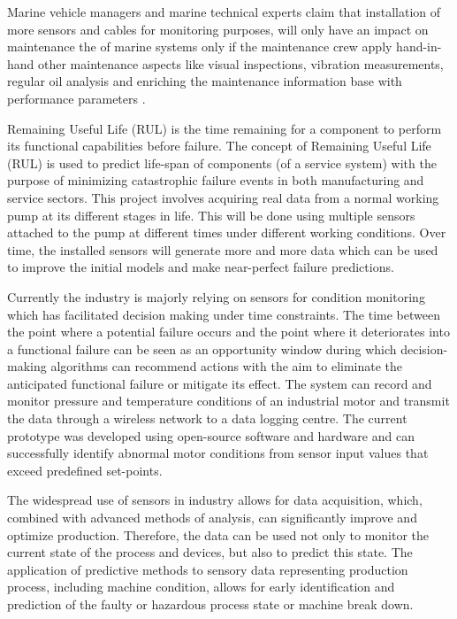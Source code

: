 Marine vehicle managers and marine technical experts claim that installation of more sensors and cables for monitoring purposes, will only have an impact on maintenance the of marine systems only if the maintenance crew apply hand-in-hand other maintenance aspects like visual inspections, vibration measurements, regular oil analysis and enriching the maintenance information base with performance parameters \cite{kimera_predictive_2020}. 

Remaining Useful Life (RUL) is the time remaining for a component to perform its functional capabilities before failure. The concept of Remaining Useful Life (RUL) is used to predict life-span of components (of a service system) with the purpose of minimizing catastrophic failure events in both manufacturing and service sectors. This project involves acquiring real data from a normal working pump at its different stages in life. This will be done using multiple sensors attached to the pump at different times under different working conditions. Over time, the installed sensors will generate more and more data which can be used to improve the initial models and make near-perfect failure predictions. 

Currently the industry is majorly relying on sensors for condition monitoring which has facilitated decision making under time constraints. The time between the point where a potential failure occurs and the point where it deteriorates into a functional failure can be seen as an opportunity window during which decision-making algorithms can recommend actions with the aim to eliminate the anticipated functional failure or mitigate its effect. The system can record and monitor pressure and temperature conditions of an industrial motor and transmit the data through a wireless network to a data logging centre. The current prototype was developed using open-source software and hardware and can successfully identify abnormal motor conditions from sensor input values that exceed predefined set-points. 

The widespread use of sensors in industry allows for data acquisition, which, combined with advanced methods of analysis, can significantly improve and optimize production. Therefore, the data can be used not only to monitor the current state of the process and devices, but also to predict this state. The application of predictive methods to sensory data representing production process, including machine condition, allows for early identification and prediction of the faulty or hazardous process state or machine break down\cite{tinga_predictive_2017}.

